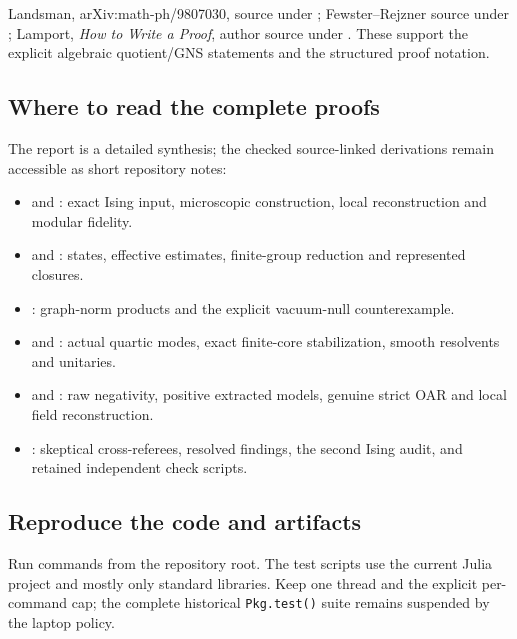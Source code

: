 \begin{description}[style=nextline]
\item[C*-algebras, weak closures, and proof presentation.]
Landsman, arXiv:math-ph/9807030, source under
; Fewster--Rejzner source
under ; Lamport,
\emph{How to Write a Proof}, author source under
. These support the explicit algebraic
quotient/GNS statements and the structured proof notation.
\end{description}

\subsection{Where to read the complete proofs}

The report is a detailed synthesis; the checked source-linked derivations
remain accessible as short repository notes:
\begin{itemize}
\item {} and
: exact Ising input, microscopic
construction, local reconstruction and modular fidelity.
\item {} and
: states, effective estimates,
finite-group reduction and represented closures.
\item {}: graph-norm products
and the explicit vacuum-null counterexample.
\item {} and
: actual quartic modes,
exact finite-core stabilization, smooth resolvents and unitaries.
\item {} and
: raw negativity,
positive extracted models, genuine strict OAR and local field reconstruction.
\item {}: skeptical cross-referees, resolved
findings, the second Ising audit, and retained independent check scripts.
\end{itemize}

\subsection{Reproduce the code and artifacts}

Run commands from the repository root. The test scripts use the current
Julia project and mostly only standard libraries. Keep one thread and the
explicit per-command cap; the complete historical \texttt{Pkg.test()} suite
remains suspended by the laptop policy.

